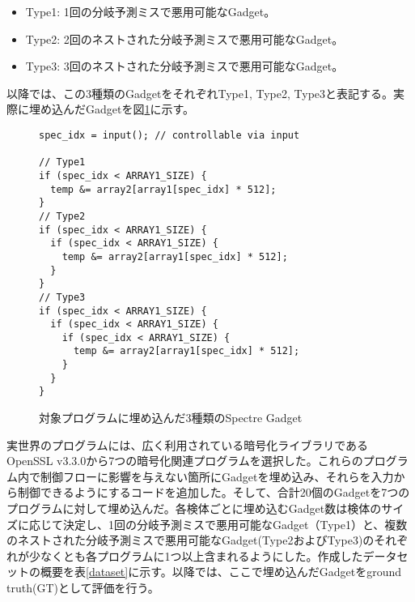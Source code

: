 \begin{itemize}
  \item Type1: 1回の分岐予測ミスで悪用可能なGadget。
  \item Type2: 2回のネストされた分岐予測ミスで悪用可能なGadget。
  \item Type3: 3回のネストされた分岐予測ミスで悪用可能なGadget。
\end{itemize}

以降では、この3種類のGadgetをそれぞれType1, Type2, Type3と表記する。実際に埋め込んだGadgetを図\ref{gadget_example}に示す。

\begin{figure}
  \begin{verbatim}
spec_idx = input(); // controllable via input 

// Type1
if (spec_idx < ARRAY1_SIZE) {
  temp &= array2[array1[spec_idx] * 512];
}
// Type2
if (spec_idx < ARRAY1_SIZE) {
  if (spec_idx < ARRAY1_SIZE) {
    temp &= array2[array1[spec_idx] * 512];
  }
}  
// Type3
if (spec_idx < ARRAY1_SIZE) {
  if (spec_idx < ARRAY1_SIZE) {
    if (spec_idx < ARRAY1_SIZE) {
      temp &= array2[array1[spec_idx] * 512];
    }
  }
} 
\end{verbatim}
  \caption{対象プログラムに埋め込んだ3種類のSpectre Gadget}
  \label{gadget_example}
\end{figure}

実世界のプログラムには、広く利用されている暗号化ライブラリであるOpenSSL\cite{OpenSSL} v3.3.0から7つの暗号化関連プログラムを選択した。これらのプログラム内で制御フローに影響を与えない箇所にGadgetを埋め込み、それらを入力から制御できるようにするコードを追加した。そして、合計20個のGadgetを7つのプログラムに対して埋め込んだ。各検体ごとに埋め込むGadget数は検体のサイズに応じて決定し、1回の分岐予測ミスで悪用可能なGadget（Type1）と、複数のネストされた分岐予測ミスで悪用可能なGadget(Type2およびType3)のそれぞれが少なくとも各プログラムに1つ以上含まれるようにした。作成したデータセットの概要を表\ref{dataset}に示す。以降では、ここで埋め込んだGadgetをground truth(GT)として評価を行う。\par

